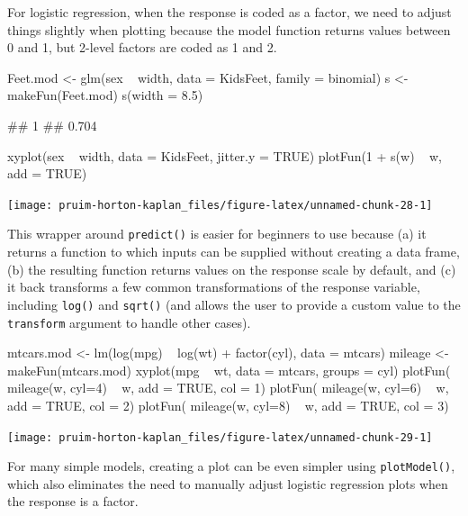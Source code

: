 \noindent
For logistic regression, when the response is coded as a factor, we need
to adjust things slightly when plotting because the model function
returns values between 0 and 1, but 2-level factors are coded as 1 and
2.

\begin{Schunk}
\begin{Sinput}
Feet.mod <- glm(sex ~ width, data = KidsFeet, family = binomial)
s <- makeFun(Feet.mod)
s(width = 8.5)
\end{Sinput}
\begin{Soutput}
##     1 
## 0.704
\end{Soutput}
\begin{Sinput}
xyplot(sex ~ width, data = KidsFeet, jitter.y = TRUE)
plotFun(1 + s(w) ~ w, add = TRUE)
\end{Sinput}


\begin{center}\texttt{[image: pruim-horton-kaplan\_files/figure-latex/unnamed-chunk-28-1]} \end{center}

\end{Schunk}

This wrapper around \texttt{predict()} is easier for beginners to use
because (a) it returns a function to which inputs can be supplied
without creating a data frame, (b) the resulting function returns values
on the response scale by default, and (c) it back transforms a few
common transformations of the response variable, including
\texttt{log()} and \texttt{sqrt()} (and allows the user to provide a
custom value to the \texttt{transform} argument to handle other cases).

\begin{Schunk}
\begin{Sinput}
mtcars.mod <- lm(log(mpg) ~ log(wt) + factor(cyl), data = mtcars)
mileage <- makeFun(mtcars.mod)
xyplot(mpg ~ wt, data = mtcars, groups = cyl)
plotFun( mileage(w, cyl=4) ~ w, add = TRUE, col = 1)
plotFun( mileage(w, cyl=6) ~ w, add = TRUE, col = 2)
plotFun( mileage(w, cyl=8) ~ w, add = TRUE, col = 3)
\end{Sinput}


\begin{center}\texttt{[image: pruim-horton-kaplan\_files/figure-latex/unnamed-chunk-29-1]} \end{center}

\end{Schunk}

For many simple models, creating a plot can be even simpler using
\texttt{plotModel()}, which also eliminates the need to manually adjust
logistic regression plots when the response is a factor.

